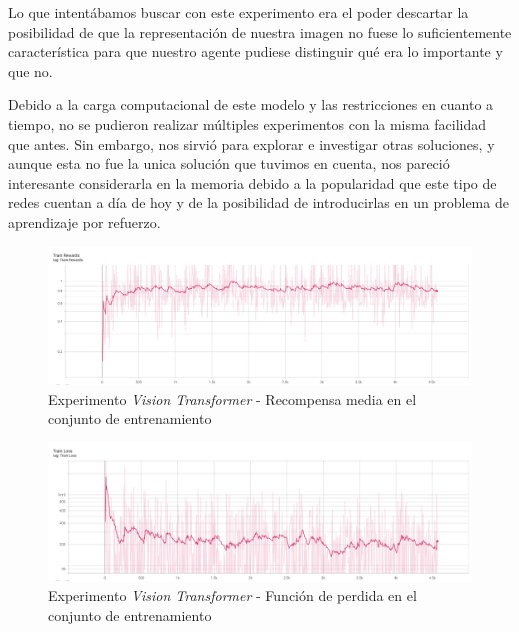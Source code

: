 Lo que intentábamos buscar con este experimento era el poder descartar la posibilidad de que la representación de nuestra imagen no fuese lo suficientemente característica para que nuestro agente pudiese distinguir qué era lo importante y que no. 
\medskip

Debido a la carga computacional de este modelo y las restricciones en cuanto a tiempo, no se pudieron realizar múltiples experimentos con la misma facilidad que antes. Sin embargo, nos sirvió para explorar e investigar otras soluciones, y aunque esta no fue la unica solución que tuvimos en cuenta, nos pareció interesante considerarla en la memoria debido a la popularidad que este tipo de redes cuentan a día de hoy y de la posibilidad de introducirlas en un problema de aprendizaje por refuerzo.
\medskip

\begin{figure}[H]
	\centering
	\includegraphics[width=1\textwidth]{figuras/experiments/vision transformers/train_rewards.png}
	\caption[Experimento \textit{Vision Transformer} - Recompensa media en el conjunto de entrenamiento]{Experimento \textit{Vision Transformer} - Recompensa media en el conjunto de entrenamiento}
	\label{fig-experimento-vision-transformer-1-training-reward-mean}
\end{figure}
\begin{figure}[H]
	\centering
	\includegraphics[width=1\textwidth]{figuras/experiments/vision transformers/train_loss.png}
	\caption[Experimento \textit{Vision Transformer} - Función de perdida en el conjunto de entrenamiento]{Experimento \textit{Vision Transformer} - Función de perdida en el conjunto de entrenamiento}
	\label{fig-experimento-vision-transformer-1-training-loss}
\end{figure}
